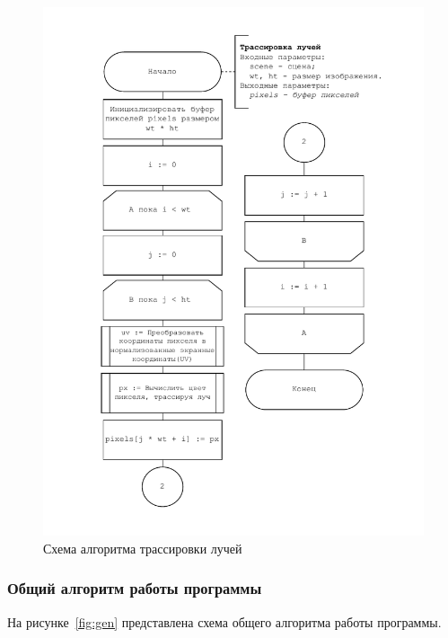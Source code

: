 \newpage
\begin{figure}[ht!]
	\begin{center}
		\includegraphics[scale=0.9]{diag/main-raytracing-pixels.pdf}
	\end{center}
	\caption{Схема алгоритма трассировки лучей}
	\label{fig:pixels}
\end{figure}

\subsubsection{Общий алгоритм работы программы}

На рисунке~\ref{fig:gen} представлена схема общего алгоритма работы программы.

